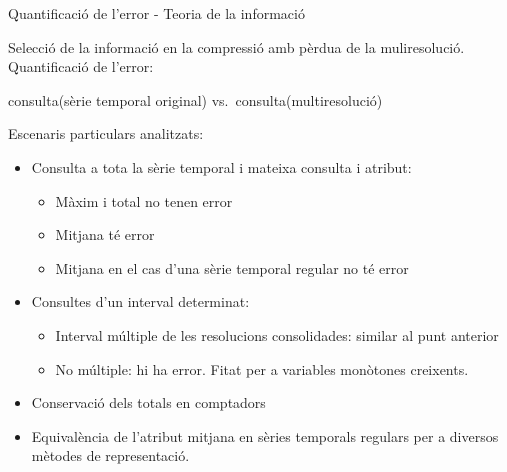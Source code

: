\begin{frame}{Quantificació de l'error - Teoria de la informació}

Selecció de la informació en la compressió amb pèrdua de la muliresolució. 
Quantificació de l'error: 

\begin{center}
consulta(sèrie temporal original) vs.\ consulta(multiresolució)
\end{center}


Escenaris particulars analitzats:
\begin{itemize}
\item Consulta a tota la sèrie temporal i mateixa consulta i atribut:
  \begin{itemize}
  \item Màxim i total no tenen error
  \item Mitjana té error
  \item Mitjana en el cas d'una sèrie temporal regular no té error 
  \end{itemize}

\item Consultes d'un interval determinat:
  \begin{itemize}
  \item Interval múltiple de les resolucions consolidades: similar al punt anterior
  \item No múltiple: hi ha error. Fitat per a variables monòtones creixents.
  \end{itemize}

\item Conservació dels totals en comptadors

\item Equivalència de l'atribut mitjana en sèries temporals regulars per a diversos mètodes de representació.

\end{itemize}

\end{frame}




